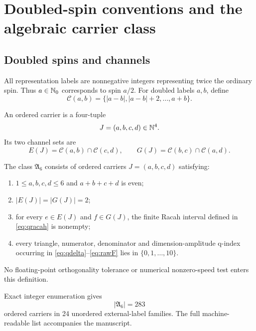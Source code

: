 \section{Doubled-spin conventions and the algebraic carrier class}
\subsection{Doubled spins and channels}
All representation labels are nonnegative integers representing twice the ordinary spin.  Thus $a\in\mathbb N_0$ corresponds to spin $a/2$.  For doubled labels $a,b$, define
\begin{equation}
\mathcal C(a,b)=\{|a-b|,|a-b|+2,\ldots,a+b\}.
\label{eq:pairchannels}
\end{equation}

\begin{definition}
An ordered carrier is a four-tuple
\[
J=(a,b,c,d)\in\mathbb N^4.
\]
Its two channel sets are
\begin{equation}
E(J)=\mathcal C(a,b)\cap\mathcal C(c,d),
\qquad
G(J)=\mathcal C(b,c)\cap\mathcal C(a,d).
\label{eq:channelsets}
\end{equation}
\end{definition}

\begin{definition}
\label{def:algebraicclass}
The class $\mathfrak A_6$ consists of ordered carriers $J=(a,b,c,d)$ satisfying:
\begin{enumerate}[label=(\alph*)]
\item $1\le a,b,c,d\le6$ and $a+b+c+d$ is even;
\item $|E(J)|=|G(J)|=2$;
\item for every $e\in E(J)$ and $f\in G(J)$, the finite Racah interval defined in \eqref{eq:qracah} is nonempty;
\item every triangle, numerator, denominator and dimension-amplitude q-index occurring in \eqref{eq:qdelta}--\eqref{eq:rawF} lies in $\{0,1,\ldots,10\}$.
\end{enumerate}
No floating-point orthogonality tolerance or numerical nonzero-speed test enters this definition.
\end{definition}

Exact integer enumeration gives
\begin{equation}
|\mathfrak A_6|=283
\end{equation}
ordered carriers in 24 unordered external-label families.  The full machine-readable list accompanies the manuscript.

